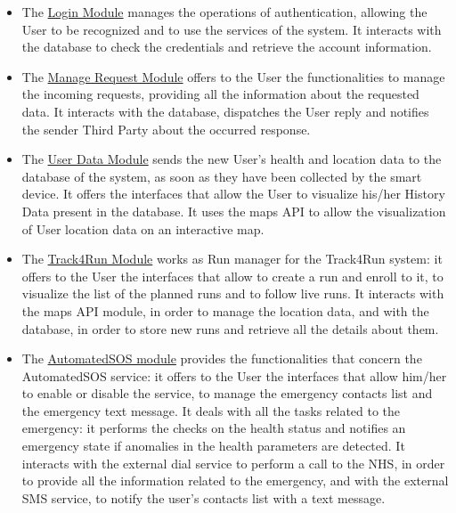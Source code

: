 \begin{itemize}
    \item The \underline{Login Module} manages the operations of authentication, allowing the User to be recognized and to use the services of the system. It interacts with the database to check the credentials and retrieve the account information.
    
    \item The \underline{Manage Request Module} offers to the User the functionalities to manage the incoming requests, providing all the information about the requested data. It interacts with the database, dispatches the User reply and notifies the sender Third Party about the occurred response.
    
    \item The \underline{User Data Module} sends the new User's health and location data to the database of the system, as soon as they have been collected by the smart device.
    It offers the interfaces that allow the User to visualize his/her History Data present in the database. It uses the maps API to allow the visualization of User location data on an interactive map.
    
    \item The \underline{Track4Run Module} works as Run manager for the Track4Run system: it offers to the User the interfaces that allow to create a run and enroll to it, to visualize the list of the planned runs and to follow live runs. It interacts with the maps API module, in order to manage the location data, and with the database, in order to store new runs and retrieve all the details about them.
    
    \item The \underline{AutomatedSOS module} provides the functionalities that concern the AutomatedSOS service: it offers to the User the interfaces that allow him/her to enable or disable the service, to manage the emergency contacts list and the emergency text message.
    It deals with all the tasks related to the emergency: it performs the checks on the health status and notifies an emergency state if anomalies in the health parameters are detected. It interacts with the external dial service to perform a call to the NHS, in order to provide all the information related to the emergency, and with the external SMS service, to notify the user's contacts list with a text message.

\end{itemize}
